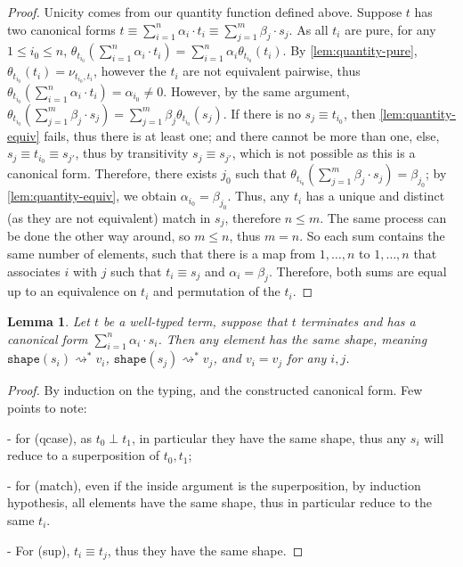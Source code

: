 \documentclass[10pt,a4paper]{article}
\newcommand{\shape}[1]{\mathtt{shape}(#1)}
\newcommand{\reduces}{\rightsquigarrow}
\newcommand{\sreduces}{\reduces^*}
\newcommand{\qt}[2]{\theta_{#1}(#2)}
\newcommand{\kroneq}[2]{\nu_{#1, #2}}
\newtheorem{lemma}[theorem]{Lemma}
\begin{document}
\begin{proof}
  Unicity comes from our quantity function defined above.
  Suppose $t$ has two canonical forms $t \equiv \sum_{i=1}^n \alpha_i
  \cdot t_i \equiv \sum_{j=1}^m \beta_j \cdot s_j$.
  As all $t_i$ are pure, for any $1 \leq i_0 \leq n$, $\qt {t_{i_0}}
  {\sum_{i=1}^n \alpha_i \cdot t_i} = \sum_{i=1}^n \alpha_i \qt{t_{i_0}} {t_i}$.
  By \autoref{lem:quantity-pure}, $\qt{t_{i_0}} {t_i} = \kroneq
  {t_{i_0}} {t_i}$, however the $t_i$ are not equivalent pairwise,
  thus $\qt {t_{i_0}} {\sum_{i=1}^n \alpha_i \cdot t_i} = \alpha_{i_0} \neq 0$.
  However, by the same argument, $\qt{t_{i_0}}{\sum_{j=1}^m \beta_j
  \cdot s_j} = \sum_{j=1}^m \beta_j \qt{t_{i_0}} {s_j}$.
  If there is no $s_j \equiv t_{i_0}$, then
  \autoref{lem:quantity-equiv} fails, thus there is at least one;
  and there cannot be more than one, else, $s_j \equiv t_{i_0} \equiv
  s_{j'}$, thus by transitivity $s_j \equiv s_{j'}$, which is not
  possible as this is a canonical form.
  Therefore, there exists $j_0$ such that $\qt{t_{i_0}}{\sum_{j=1}^m
  \beta_j \cdot s_j} = \beta_{j_0}$;
  by \autoref{lem:quantity-equiv}, we obtain $\alpha_{i_0} = \beta_{j_0}$.
  Thus, any $t_i$ has a unique and distinct (as they are not
  equivalent) match in $s_j$, therefore $n \leq m$.
  The same process can be done the other way around, so $m \leq n$,
  thus $ m = n$.
  So each sum contains the same number of elements, such that there
  is a map from $1, \dots, n$ to $1, \dots, n$ that associates $i$
  with $j$ such that $t_i \equiv s_j$ and $\alpha_i = \beta_j$.
  Therefore, both sums are equal up to an equivalence on $t_i$ and
  permutation of the $t_i$. \qedhere
\end{proof}

\begin{lemma}\label{lem:canonical-shape}
  Let $t$ be a well-typed term, suppose that $t$ terminates
  and has a canonical form $\sum_{i=1}^n \alpha_i \cdot s_i$. Then
  any element has the same
  shape, meaning $\shape{s_i} \sreduces v_i$,
  $\shape{s_j} \sreduces v_j$, and $v_i = v_j$ for any $i, j$.
\end{lemma}

\begin{proof}
  By induction on the typing, and the constructed canonical form. Few
  points to note:

  - for (qcase), as $t_0 \perp t_1$, in particular they have the same shape,
  thus any $s_i$ will reduce to a superposition of $t_0, t_1$;

  - for (match), even if the inside argument is the superposition, by
  induction hypothesis,
  all elements have the same shape, thus in particular reduce to the same $t_i$.

  - For (sup), $t_i \equiv t_j$, thus they have the same shape. \qedhere
\end{proof}
\end{document}
